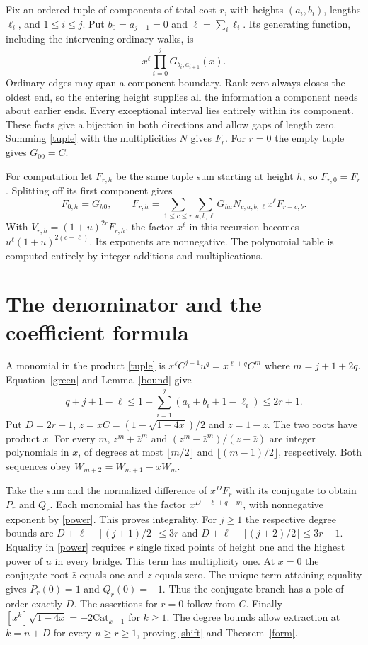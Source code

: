 \documentclass[11pt,letterpaper]{article}
\newcommand{\Cat}{\mathrm{Cat}}
\begin{document}
Fix an ordered tuple of components of total cost $r$, with heights $(a_i,b_i)$, lengths $\ell_i$, and $1\le i\le j$. Put $b_0=a_{j+1}=0$ and $\ell=\sum_i\ell_i$. Its generating function, including the intervening ordinary walks, is
\begin{equation}
 x^\ell\prod_{i=0}^{j}G_{b_i,a_{i+1}}(x). \label{tuple}
\end{equation}
Ordinary edges may span a component boundary. Rank zero always closes the oldest end, so the entering height supplies all the information a component needs about earlier ends. Every exceptional interval lies entirely within its component. These facts give a bijection in both directions and allow gaps of length zero. Summing \eqref{tuple} with the multiplicities $N$ gives $F_r$. For $r=0$ the empty tuple gives $G_{00}=C$.

For computation let $F_{r,h}$ be the same tuple sum starting at height $h$, so $F_{r,0}=F_r$. Splitting off its first component gives
\[
 F_{0,h}=G_{h0},\qquad
 F_{r,h}=\sum_{1\le c\le r}\sum_{a,b,\ell}
 G_{ha}N_{c,a,b,\ell}x^\ell F_{r-c,b}.
\]
With $V_{r,h}=(1+u)^{2r}F_{r,h}$, the factor $x^\ell$ in this recursion becomes $u^\ell(1+u)^{2(c-\ell)}$. Its exponents are nonnegative. The polynomial table is computed entirely by integer additions and multiplications.

\section{The denominator and the coefficient formula}
A monomial in the product \eqref{tuple} is $x^\ell C^{j+1}u^q=x^{\ell+q}C^m$ where $m=j+1+2q$. Equation~\eqref{green} and Lemma~\ref{bound} give
\begin{equation}
 q+j+1-\ell\le 1+\sum_{i=1}^j(a_i+b_i+1-\ell_i)\le 2r+1. \label{power}
\end{equation}
Put $D=2r+1$, $z=xC=(1-\sqrt{1-4x})/2$ and $\bar z=1-z$. The two roots have product $x$. For every $m$, $z^m+\bar z^m$ and $(z^m-\bar z^m)/(z-\bar z)$ are integer polynomials in $x$, of degrees at most $\lfloor m/2\rfloor$ and $\lfloor(m-1)/2\rfloor$, respectively. Both sequences obey $W_{m+2}=W_{m+1}-xW_m$.

Take the sum and the normalized difference of $x^D F_r$ with its conjugate to obtain $P_r$ and $Q_r$. Each monomial has the factor $x^{D+\ell+q-m}$, with nonnegative exponent by \eqref{power}. This proves integrality. For $j\ge1$ the respective degree bounds are $D+\ell-\lceil(j+1)/2\rceil\le3r$ and $D+\ell-\lceil(j+2)/2\rceil\le3r-1$. Equality in \eqref{power} requires $r$ single fixed points of height one and the highest power of $u$ in every bridge. This term has multiplicity one. At $x=0$ the conjugate root $\bar z$ equals one and $z$ equals zero. The unique term attaining equality gives $P_r(0)=1$ and $Q_r(0)=-1$. Thus the conjugate branch has a pole of order exactly $D$. The assertions for $r=0$ follow from $C$. Finally $[x^k]\sqrt{1-4x}=-2\Cat_{k-1}$ for $k\ge1$. The degree bounds allow extraction at $k=n+D$ for every $n\ge r\ge1$, proving \eqref{shift} and Theorem~\ref{form}.
\end{document}

